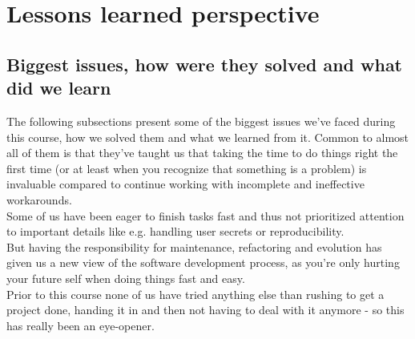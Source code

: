 \section{Lessons learned perspective}
\subsection{Biggest issues, how were they solved and what did we learn }



The following subsections present some of the biggest issues we've faced during this course, how we solved them and what we learned from it. Common to almost all of them is that they've taught us that taking the time to do things right the first time (or at least when you recognize that something is a problem) is invaluable compared to continue working with incomplete and ineffective workarounds. \\ Some of us have been eager to finish tasks fast and thus not prioritized attention to important details like e.g. handling user secrets or reproducibility. \\
But having the responsibility for maintenance, refactoring and evolution has given us a new view of the software development process, as you're only hurting your future self when doing things fast and easy. \\
Prior to this course none of us have tried anything else than rushing to get a project done, handing it in and then not having to deal with it anymore - so this has really been an eye-opener. \\

